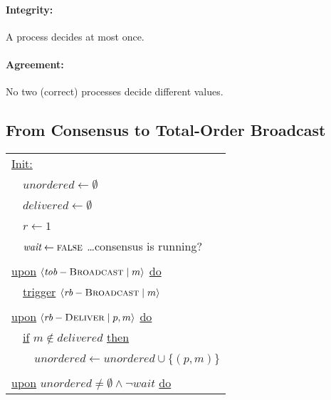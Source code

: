 \documentclass{article}
\begin{document}
\begin{adjustwidth}{2em}{2em}
\begin{adjustwidth}{2em}{2em}
\begin{adjustwidth}{2em}{}
				\paragraph{Integrity:}
				\begin{adjustwidth}{1em}{}
					A process decides at most once.
				\end{adjustwidth}
				\paragraph{Agreement:}
				\begin{adjustwidth}{1em}{}
					No two (correct) processes decide different values.
				\end{adjustwidth}
			\end{adjustwidth}
		\end{adjustwidth}
		\subsection{From Consensus to Total-Order Broadcast}
		\begin{adjustwidth}{2em}{2em}
			\begin{center}
				\begin{tabular}{l}
					\underline{Init:} \\
					\ \ $\textit{unordered} \leftarrow \emptyset$ \\
					\ \ $\textit{delivered} \leftarrow \emptyset$ \\
					\ \ $r \leftarrow 1$ \\
					\ \ $\textit{wait} \leftarrow \textsc{false}$ \ldots consensus is running? \\
					\\
					\underline{upon} $\langle \textit{tob}-\textsc{Broadcast} \mid m \rangle$ \underline{do} \\
					\ \ \underline{trigger} $\langle \textit{rb}-\textsc{Broadcast} \mid m \rangle$ \\
					\\
					\underline{upon} $\langle \textit{rb}-\textsc{Deliver} \mid p, m \rangle$ \underline{do} \\
					\ \ \underline{if} $m \not\in \textit{delivered}$ \underline{then} \\
					\ \ \ \ $\textit{unordered} \leftarrow \textit{unordered} \cup \{ (p, m) \}$ \\
					\\
					\underline{upon} $\textit{unordered} \neq \emptyset \wedge \neg \textit{wait}$ \underline{do} \\

\end{tabular}
\end{center}
\end{adjustwidth}
\end{adjustwidth}
\end{document}
